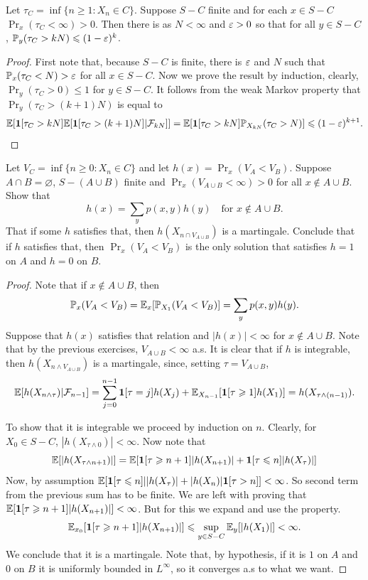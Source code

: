 \begin{exercise}[5.2.6]
	Let $\tau_C = \inf \{n \geq 1 : X_n \in C\}$. Suppose $S - C$ finite
	and for each $x \in S-C$
	$\Pr_x(\tau_C < \infty) > 0$. Then there is as $N < \infty$ and
	$\varepsilon > 0$ so that
	for all $y \in S - C$, $\mathbb{P}_y(\tau_C > kN) \leqslant (1-\varepsilon)^k$.
\end{exercise}

\begin{proof}
	First note that, because $S-C$ is finite, there is $\varepsilon$ and $N$
	such that $\mathbb{P}_x(\tau_C < N) > \varepsilon$ for all $x \in S - C$. Now we
	prove the result by induction,
	clearly, $\Pr_y(\tau_C > 0) \leq 1$ for $y \in S-C$. It follows from the weak
	Markov property that $\Pr_y(\tau_C > (k+1)N)$ is equal to
	\[
		\mathbb{E}[\bm{1}[\tau_C > kN]\mathbb{E}[\bm{1}[\tau_C > (k+1)N] | \mathcal{F}_{kN}]]
		= \mathbb{E}[\bm{1}[\tau_C > kN] \mathbb{P}_{X_{kN}}(\tau_C > N)] \leqslant (1-\varepsilon)^{k+1}.
	\]
\end{proof}

\begin{exercise}[5.2.7]
	Let $V_C = \inf\{n \geq 0 : X_n \in C\}$ and let $h(x) = \Pr_x(V_A <
	V_B)$. Suppose $A \cap B = \varnothing$,
	$S - (A \cup B)$ finite and $\Pr_x(V_{A \cup B} < \infty) > 0$ for
	all $x \not \in A \cup B$.
	Show that
	\[
		h(x) = \sum_{y} p(x,y)h(y) \quad \text{for } x \not \in A \cup B.
	\]
	That if some $h$ satisfies that, then $h(X_{n \cap V_{A \cup B}})$
	is a martingale.
	Conclude that if $h$ satisfies that, then $\Pr_x(V_A < V_B)$ is the
	only solution
	that satisfies $h = 1$ on $A$ and $h = 0$ on $B$.
\end{exercise}

\begin{proof}
	Note that if $x \not \in A \cup B$, then
	\[
		\mathbb{P}_x(V_A < V_B) = \mathbb{E}_x[\mathbb{P}_{X_1}(V_A < V_B)] = \sum_y p(x,y)h(y).
	\]
	Suppose that $h(x)$ satisfies that relation and $|h(x)| < \infty$
	for $x \not \in A \cup B$.
	Note that by the previous exercises, $V_{A \cup B} < \infty$ a.s. It is clear
	that if $h$ is integrable, then $h(X_{n \land V_{A \cup B}})$ is a martingale,
	since, setting $\tau = V_{A \cup B}$,
	\[
		\mathbb{E}[h(X_{n \land \tau}) | \mathcal{F}_{n-1}]
		= \sum_{j = 0}^{n-1} \bm{1}[\tau = j]h(X_j) + \mathbb{E}_{X_{n-1}}[\bm{1}[\tau
		\geqslant 1] h(X_1)] =
		h(X_{\tau \land (n-1)}).
	\]

	To show that it is integrable we proceed by induction on $n$. Clearly,
	for $X_0 \in S - C$, $|h(X_{\tau \land 0})| < \infty$. Now note that
	\[
		\mathbb{E}[|h(X_{\tau \land n+1})|] = \mathbb{E}[\bm{1}[\tau \geqslant n+1]|h(X_{n+1})| +
		\bm{1}[\tau \leqslant n]|h(X_{\tau})|]
	\]
	Now, by assumption $\mathbb{E}[\bm{1}[\tau \leqslant
	n]||h(X_\tau)| + |h(X_n)|\bm{1}[\tau > n]] < \infty$.
	So second term from the previous sum has to be finite. We
	are left with proving that $\mathbb{E}[\bm{1}[\tau \geqslant n+1] |h(X_{n+1})|] < \infty$.
	But for this we expand and use the property.
	\[
		\mathbb{E}_{x_0}[\bm{1}[\tau \geqslant n+1] |h(X_{n+1})|] \leqslant \sup_{y \in S - C}
		\mathbb{E}_y[|h(X_1)|] < \infty.
	\]
	We conclude that it is a martingale. Note that, by hypothesis, if
	it is $1$ on $A$
	and $0$ on $B$ it is uniformly bounded in $L^\infty$, so it converges a.s
	to what we want.
\end{proof}

